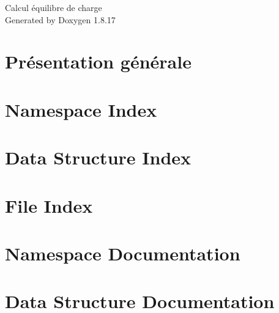 \let\mypdfximage\pdfximage\def\pdfximage{\immediate\mypdfximage}\documentclass[twoside]{book}
\newcommand{\+}{\discretionary{\mbox{\scriptsize$\hookleftarrow$}}{}{}}
\newcommand{\clearemptydoublepage}{%
  \newpage{\pagestyle{empty}\cleardoublepage}%
}
\begin{document}
\hypersetup{pageanchor=false,
             bookmarksnumbered=true,
             pdfencoding=unicode
            }
\begin{titlepage}
\vspace*{7cm}
\begin{center}%
{\Large Calcul équilibre de charge }\\
\vspace*{1cm}
{\large Generated by Doxygen 1.8.17}\\
\end{center}
\end{titlepage}
\clearemptydoublepage
{}
\tableofcontents
\clearemptydoublepage
{}
\hypersetup{pageanchor=true}

\chapter{Présentation générale}
\label{index}\hypertarget{index}{}
\chapter{Namespace Index}

\chapter{Data Structure Index}

\chapter{File Index}

\chapter{Namespace Documentation}

\chapter{Data Structure Documentation}

\end{document}
